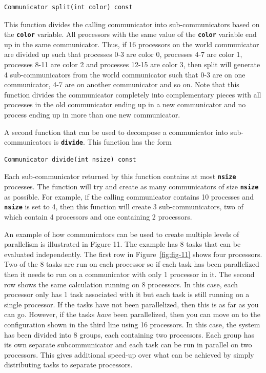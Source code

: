 {
\color{red}
\begin{Verbatim}[fontseries=b]
Communicator split(int color) const
\end{Verbatim}
}

This function divides the calling communicator into sub-communicators based on the \texttt{\textbf{color}} variable. All processors with the same value of the \texttt{\textbf{color}} variable end up in the same communicator. Thus, if 16 processors on the world communicator are divided up such that processes 0-3 are color 0, processes 4-7 are color 1, processes 8-11 are color 2 and processes 12-15 are color 3, then split will generate 4 sub-communicators from the world communicator such that 0-3 are on one communicator, 4-7 are on another communicator and so on. Note that this function divides the communicator completely into complementary pieces with all processes in the old communicator ending up in a new communicator and no process ending up in more than one new communicator.

A second function that can be used to decompose a communicator into sub-communicators is \texttt{\textbf{divide}}. This function has the form

{
\color{red}
\begin{Verbatim}[fontseries=b]
Communicator divide(int nsize) const
\end{Verbatim}
}

Each sub-communicator returned by this function contains at most \texttt{\textbf{nsize}} processes. The function will try and create as many communicators of size \texttt{\textbf{nsize}} as possible. For example, if the calling communicator contains 10 processes and \texttt{\textbf{nsize}} is set to 4, then this function will create 3 sub-communicators, two of which contain 4 processors and one containing 2 processors.

An example of how communicators can be used to create multiple levels of parallelism is illustrated in Figure 11. The example has 8 tasks that can be evaluated independently. The first row in Figure~\ref{fig:fig-11} shows four processors. Two of the 8 tasks are run on each processor so if each task has been parallelized then it needs to run on a communicator with only 1 processor in it. The second row shows the same calculation running on 8 processors. In this case, each processor only has 1 task associated with it but each task is still running on a single processor. If the tasks have not been parallelized, then this is as far as you can go. However, if the tasks \textit{have} been parallelized, then you can move on to the configuration shown in the third line using 16 processors. In this case, the system has been divided into 8 groups, each containing two processors. Each group has its own separate subcommunicator and each task can be run in parallel on two processors. This gives additional speed-up over what can be achieved by simply distributing tasks to separate processors.


